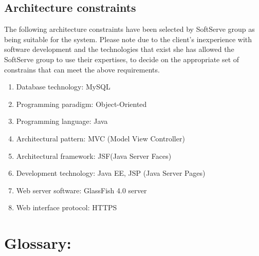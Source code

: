 \documentclass[12pt]{article}
\begin{document}
\vspace{0.2in}

\subsection{Architecture constraints}
\vspace{0.2in}

The following architecture constraints have been selected by SoftServe group as being suitable for the system. Please note due to the client's inexperience with software development and the technologies that exist she has allowed the SoftServe group to use their expertises, to decide on the appropriate set of constrains that can meet the above requirements.
\begin{enumerate}
\item Database technology: MySQL
\item Programming paradigm: Object-Oriented
\item Programming language: Java
\item Architectural pattern: MVC (Model View Controller)
\item Architectural framework: JSF(Java Server Faces)
\item Development technology: Java EE, JSP (Java Server Pages)
\item Web server software: GlassFish 4.0 server
\item Web interface protocol: HTTPS
\end{enumerate}
\vspace{0.5in}

\newpage
\section{Glossary:}
\vspace{0.2in}
\end{document}
